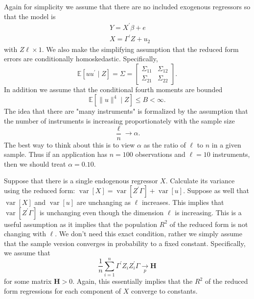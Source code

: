 \documentclass[10pt]{article}
\begin{document}
Again for simplicity we assume that there are no included exogenous regressors so that the model is
$$
\begin{aligned}
&Y=X^{\prime} \beta+e \\
&X=\Gamma^{\prime} Z+u_{2}
\end{aligned}
$$
with $Z \ell \times 1$. We also make the simplifying assumption that the reduced form errors are conditionally homoskedastic. Specifically,
$$
\mathbb{E}\left[u u^{\prime} \mid Z\right]=\Sigma=\left[\begin{array}{cc}
\Sigma_{11} & \Sigma_{12} \\
\Sigma_{21} & \Sigma_{22}
\end{array}\right] .
$$
In addition we assume that the conditional fourth moments are bounded
$$
\mathbb{E}\left[\|u\|^{4} \mid Z\right] \leq B<\infty .
$$
The idea that there are "many instruments" is formalized by the assumption that the number of instruments is increasing proportionately with the sample size
$$
\frac{\ell}{n} \longrightarrow \alpha .
$$
The best way to think about this is to view $\alpha$ as the ratio of $\ell$ to $n$ in a given sample. Thus if an application has $n=100$ observations and $\ell=10$ instruments, then we should treat $\alpha=0.10$.

Suppose that there is a single endogenous regressor $X$. Calculate its variance using the reduced form: $\operatorname{var}[X]=\operatorname{var}\left[Z^{\prime} \Gamma\right]+\operatorname{var}[u]$. Suppose as well that $\operatorname{var}[X]$ and $\operatorname{var}[u]$ are unchanging as $\ell$ increases. This implies that $\operatorname{var}\left[Z^{\prime} \Gamma\right]$ is unchanging even though the dimension $\ell$ is increasing. This is a useful assumption as it implies that the population $R^{2}$ of the reduced form is not changing with $\ell$. We don't need this exact condition, rather we simply assume that the sample version converges in probability to a fixed constant. Specifically, we assume that
$$
\frac{1}{n} \sum_{i=1}^{n} \Gamma^{\prime} Z_{i} Z_{i}^{\prime} \Gamma \underset{p}{\longrightarrow} \boldsymbol{H}
$$
for some matrix $\boldsymbol{H}>0$. Again, this essentially implies that the $R^{2}$ of the reduced form regressions for each component of $X$ converge to constants.
\end{document}
